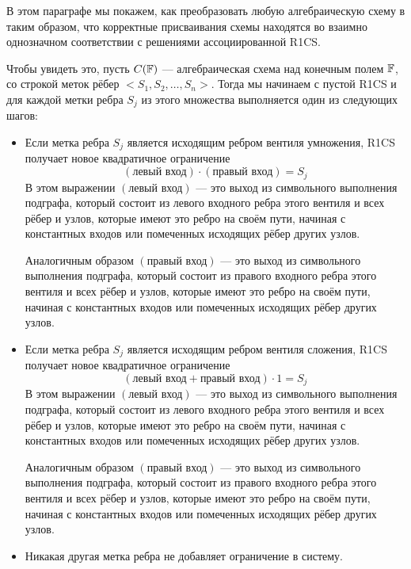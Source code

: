 В этом параграфе мы покажем, как преобразовать любую алгебраическую схему в  таким образом, что корректные присваивания схемы находятся во взаимно однозначном соответствии с решениями ассоциированной R1CS.

Чтобы увидеть это, пусть $C(\mathbb{F})$ — алгебраическая схема над конечным полем $\mathbb{F}$, со строкой меток рёбер $<S_1,S_2,\ldots, S_n>$. Тогда мы начинаем с пустой R1CS и для каждой метки ребра $S_j$ из этого множества выполняется один из следующих шагов:
\begin{itemize}
\label{algebraic-gates}
\item Если метка ребра $S_j$ является исходящим ребром вентиля умножения, R1CS получает новое квадратичное ограничение
\begin{equation}
(\text{левый вход})\cdot (\text{правый вход}) = S_j
\end{equation} 
В этом выражении $(\text{левый вход})$ — это выход из символьного выполнения подграфа, который состоит из левого входного ребра этого вентиля и всех рёбер и узлов, которые имеют это ребро на своём пути, начиная с константных входов или помеченных исходящих рёбер других узлов.

Аналогичным образом $(\text{правый вход})$ — это выход из символьного выполнения подграфа, который состоит из правого входного ребра этого вентиля и всех рёбер и узлов, которые имеют это ребро на своём пути, начиная с константных входов или помеченных исходящих рёбер других узлов.
\item Если метка ребра $S_j$ является исходящим ребром вентиля сложения, R1CS получает новое квадратичное ограничение
\begin{equation}
(\text{левый вход} + \text{правый вход})\cdot 1 = S_j
\end{equation}  
В этом выражении $(\text{левый вход})$ — это выход из символьного выполнения подграфа, который состоит из левого входного ребра этого вентиля и всех рёбер и узлов, которые имеют это ребро на своём пути, начиная с константных входов или помеченных исходящих рёбер других узлов.

Аналогичным образом $(\text{правый вход})$ — это выход из символьного выполнения подграфа, который состоит из правого входного ребра этого вентиля и всех рёбер и узлов, которые имеют это ребро на своём пути, начиная с константных входов или помеченных исходящих рёбер других узлов.
\item Никакая другая метка ребра не добавляет ограничение в систему.
\end{itemize}

